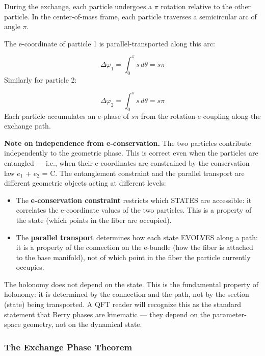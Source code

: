 \documentclass[aps,prd,preprint,superscriptaddress,longbibliography,floatfix]{revtex4-2}
\theoremstyle{remark}
\begin{document}
During the exchange, each particle undergoes a $\pi$ rotation relative to the other particle. In the center-of-mass frame, each particle traverses a semicircular arc of angle $\pi$.

The e-coordinate of particle 1 is parallel-transported along this arc:


\begin{equation}
    \Delta\varphi_{1} = \int_0^{\pi} s \, d\theta = s\pi
\end{equation}
Similarly for particle 2:


\begin{equation}
    \Delta\varphi_{2} = \int_0^{\pi} s \, d\theta = s\pi
\end{equation}
Each particle accumulates an e-phase of $s\pi$ from the rotation-e coupling along the exchange path.

\textbf{Note on independence from e-conservation.} The two particles contribute independently to the geometric phase. This is correct even when the particles are entangled --- i.e., when their e-coordinates are constrained by the conservation law $e_1$ + $e_2$ = C. The entanglement constraint and the parallel transport are different geometric objects acting at different levels:


\begin{itemize}
  \item The \textbf{e-conservation constraint} restricts which STATES are accessible: it correlates the e-coordinate values of the two particles. This is a property of the state (which points in the fiber are occupied).
  \item The \textbf{parallel transport} determines how each state EVOLVES along a path: it is a property of the connection on the e-bundle (how the fiber is attached to the base manifold), not of which point in the fiber the particle currently occupies.
\end{itemize}

The holonomy does not depend on the state. This is the fundamental property of holonomy: it is determined by the connection and the path, not by the section (state) being transported. A QFT reader will recognize this as the standard statement that Berry phases are kinematic --- they depend on the parameter-space geometry, not on the dynamical state.


\subsubsection{The Exchange Phase Theorem}
\end{document}
